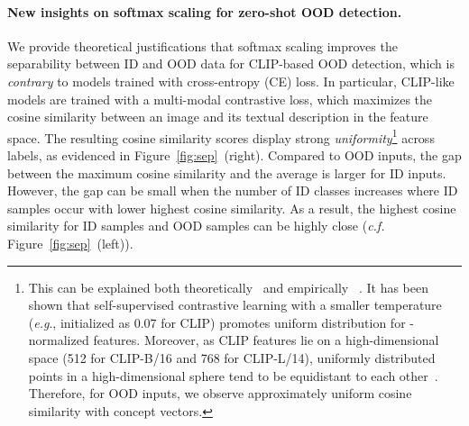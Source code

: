 \documentclass{article}
\def\eg{\emph{e.g}., }
\begin{document}
\paragraph{New insights on softmax scaling for zero-shot OOD detection.} 
We provide theoretical justifications that softmax scaling improves the separability between ID and OOD data for CLIP-based OOD detection, which is \emph{contrary} to models trained with cross-entropy (CE) loss.
In particular, CLIP-like models are trained with a multi-modal contrastive loss, which maximizes the cosine similarity between an image and its textual description in the feature space. The resulting cosine similarity scores display strong \emph{uniformity}\footnote{\noindent This can be explained both theoretically~\cite{wang2020understanding} and empirically ~\cite{wang2021understanding}. It has been shown that self-supervised contrastive learning with a smaller temperature (\eg initialized as 0.07 for CLIP) promotes uniform distribution for -normalized features. Moreover, as CLIP features lie on a high-dimensional space (512 for CLIP-B/16 and 768 for CLIP-L/14), uniformly distributed points in a high-dimensional sphere tend to be equidistant to each other~\cite{vershynin2018high}. Therefore, for OOD inputs, we observe approximately uniform cosine similarity with concept vectors.} across labels, as evidenced in Figure~\ref{fig:sep}~(right). Compared to OOD inputs, the {gap} between the maximum cosine similarity and the average is larger for ID inputs. However, the gap can be small when the number of ID classes increases where ID samples occur with lower highest cosine similarity. As a result,  the highest cosine similarity for ID samples and OOD samples can be highly close (\emph{c.f.} Figure~\ref{fig:sep}~(left)). 
\end{document}
